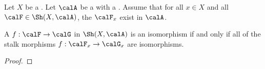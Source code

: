 \begin{proposition} \label{proposition:morphism_of_sheaves_on_topological_space_valued_in_nice_enough_category_with_enough_direct_limits_is_isomorphism_iff_all_stalk_morphisms_are}
    Let $X$ be a . Let $\calA$ be a  with a . Assume that for all $x \in X$ and all $\calF \in \Sh(X, \calA)$, the  $\calF_x$ exist in $\calA$. 
    
    A  $f: \calF \to \calG$ in $\Sh(X, \calA)$ is an isomorphism if and only if all of the stalk morphisms $f: \calF_x \to \calG_x$ are isomorphisms. 
\end{proposition}
\begin{proof}
    \TODO{}
\end{proof}
